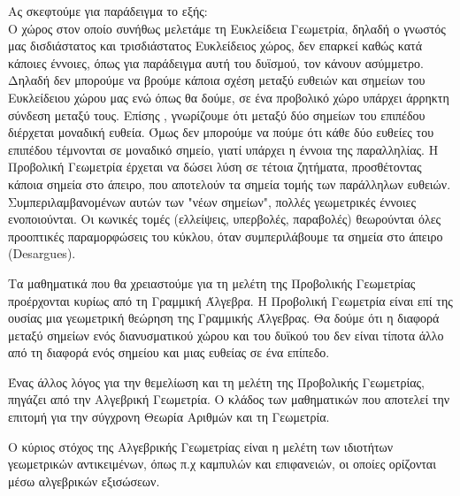 \documentclass[12pt, a4paper]{book}
\begin{document}
Ας σκεφτούμε για παράδειγμα το εξής:\\
Ο χώρος στον οποίο συνήθως μελετάμε τη Ευκλείδεια Γεωμετρία, δηλαδή ο γνωστός μας δισδιάστατος και τρισδιάστατος Ευκλείδειος χώρος, δεν επαρκεί καθώς κατά κάποιες έννοιες, όπως για παράδειγμα αυτή του δυϊσμού, τον κάνουν ασύμμετρο. Δηλαδή δεν μπορούμε να βρούμε κάποια σχέση μεταξύ ευθειών και σημείων του Ευκλείδειου χώρου μας ενώ όπως θα δούμε, σε ένα προβολικό χώρο υπάρχει άρρηκτη σύνδεση μεταξύ τους. Επίσης , γνωρίζουμε ότι μεταξύ δύο σημείων του επιπέδου διέρχεται μοναδική ευθεία. Όμως δεν μπορούμε να πούμε ότι κάθε δύο ευθείες του επιπέδου τέμνονται σε μοναδικό σημείο, γιατί υπάρχει η έννοια της παραλληλίας. Η Προβολική Γεωμετρία έρχεται να δώσει λύση σε τέτοια ζητήματα, προσθέτοντας κάποια σημεία στο άπειρο, που αποτελούν τα σημεία τομής των παράλληλων ευθειών.  Συμπεριλαμβανομένων αυτών των "νέων σημείων", πολλές γεωμετρικές έννοιες ενοποιούνται. Οι κωνικές τομές (ελλείψεις, υπερβολές, παραβολές) θεωρούνται όλες προοπτικές παραμορφώσεις του κύκλου, όταν συμπεριλάβουμε τα σημεία στο άπειρο (\foreignlanguage{english}{Desargues}).

Τα μαθηματικά που θα χρειαστούμε για τη μελέτη της Προβολικής Γεωμετρίας προέρχονται κυρίως από τη Γραμμική Άλγεβρα. Η Προβολική Γεωμετρία είναι επί της ουσίας μια γεωμετρική θεώρηση της Γραμμικής Άλγεβρας. Θα δούμε ότι η διαφορά μεταξύ σημείων ενός διανυσματικού χώρου και του δυϊκού του δεν είναι τίποτα άλλο από τη διαφορά ενός σημείου και μιας ευθείας σε ένα επίπεδο.

Ένας άλλος λόγος για την θεμελίωση και τη μελέτη της Προβολικής Γεωμετρίας, πηγάζει από την Αλγεβρική Γεωμετρία. Ο κλάδος των μαθηματικών που αποτελεί την επιτομή για την σύγχρονη Θεωρία Αριθμών και τη Γεωμετρία.

Ο κύριος στόχος της Αλγεβρικής Γεωμετρίας είναι η μελέτη των ιδιοτήτων γεωμετρικών αντικειμένων, όπως π.χ καμπυλών και επιφανειών, οι οποίες ορίζονται μέσω αλγεβρικών εξισώσεων. 
\end{document}

